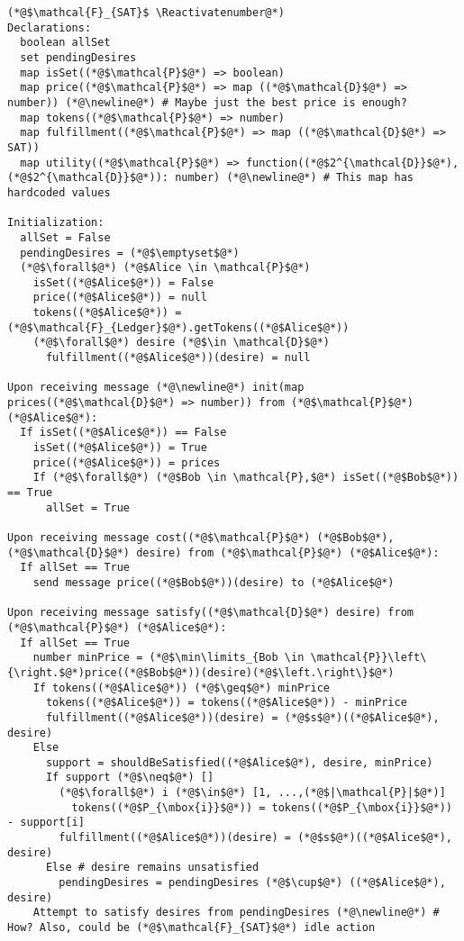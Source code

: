 \Suppressnumber
\begin{lstlisting}[label=satfunc, style=numbers]
(*@$\mathcal{F}_{SAT}$ \Reactivatenumber@*)
Declarations:
  boolean allSet
  set pendingDesires
  map isSet((*@$\mathcal{P}$@*) => boolean)
  map price((*@$\mathcal{P}$@*) => map ((*@$\mathcal{D}$@*) => number)) (*@\newline@*) # Maybe just the best price is enough?
  map tokens((*@$\mathcal{P}$@*) => number)
  map fulfillment((*@$\mathcal{P}$@*) => map ((*@$\mathcal{D}$@*) => SAT))
  map utility((*@$\mathcal{P}$@*) => function((*@$2^{\mathcal{D}}$@*), (*@$2^{\mathcal{D}}$@*)): number) (*@\newline@*) # This map has hardcoded values

Initialization:
  allSet = False
  pendingDesires = (*@$\emptyset$@*)
  (*@$\forall$@*) (*@$Alice \in \mathcal{P}$@*)
    isSet((*@$Alice$@*)) = False
    price((*@$Alice$@*)) = null
    tokens((*@$Alice$@*)) = (*@$\mathcal{F}_{Ledger}$@*).getTokens((*@$Alice$@*))
    (*@$\forall$@*) desire (*@$\in \mathcal{D}$@*)
      fulfillment((*@$Alice$@*))(desire) = null

Upon receiving message (*@\newline@*) init(map prices((*@$\mathcal{D}$@*) => number)) from (*@$\mathcal{P}$@*) (*@$Alice$@*):
  If isSet((*@$Alice$@*)) == False
    isSet((*@$Alice$@*)) = True
    price((*@$Alice$@*)) = prices
    If (*@$\forall$@*) (*@$Bob \in \mathcal{P},$@*) isSet((*@$Bob$@*)) == True
      allSet = True

Upon receiving message cost((*@$\mathcal{P}$@*) (*@$Bob$@*), (*@$\mathcal{D}$@*) desire) from (*@$\mathcal{P}$@*) (*@$Alice$@*):
  If allSet == True
    send message price((*@$Bob$@*))(desire) to (*@$Alice$@*)

Upon receiving message satisfy((*@$\mathcal{D}$@*) desire) from (*@$\mathcal{P}$@*) (*@$Alice$@*):
  If allSet == True
    number minPrice = (*@$\min\limits_{Bob \in \mathcal{P}}\left\{\right.$@*)price((*@$Bob$@*))(desire)(*@$\left.\right\}$@*)
    If tokens((*@$Alice$@*)) (*@$\geq$@*) minPrice
      tokens((*@$Alice$@*)) = tokens((*@$Alice$@*)) - minPrice
      fulfillment((*@$Alice$@*))(desire) = (*@$s$@*)((*@$Alice$@*), desire)
    Else
      support = shouldBeSatisfied((*@$Alice$@*), desire, minPrice)
      If support (*@$\neq$@*) []
        (*@$\forall$@*) i (*@$\in$@*) [1, ...,(*@$|\mathcal{P}|$@*)]
          tokens((*@$P_{\mbox{i}}$@*)) = tokens((*@$P_{\mbox{i}}$@*)) - support[i]
        fulfillment((*@$Alice$@*))(desire) = (*@$s$@*)((*@$Alice$@*), desire)
      Else # desire remains unsatisfied
        pendingDesires = pendingDesires (*@$\cup$@*) ((*@$Alice$@*), desire)
    Attempt to satisfy desires from pendingDesires (*@\newline@*) # How? Also, could be (*@$\mathcal{F}_{SAT}$@*) idle action


\end{lstlisting}
